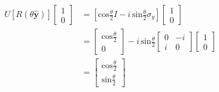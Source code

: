     \begin{equation*}
        \begin{split}
            U[R(\theta\hat{\mathbf{y}})]
            \begin{bmatrix}
                1 \\
                0
            \end{bmatrix} & = \left[ \textrm{cos}\frac{\theta}{2}I - i \, \textrm{sin}\frac{\theta}{2}\sigma_{y}\right]
            \begin{bmatrix}
                1 \\
                0
            \end{bmatrix} \\
            & = 
            \begin{bmatrix}
                \textrm{cos}\frac{\theta}{2} \\
                0
            \end{bmatrix} - i \, \textrm{sin}\frac{\theta}{2}
            \begin{bmatrix}
                0 & -i \\
                i & 0
            \end{bmatrix}
            \begin{bmatrix}
                1 \\
                0
            \end{bmatrix} \\
            & = 
            \begin{bmatrix}
                \textrm{cos}\frac{\theta}{2} \\
                \textrm{sin}\frac{\theta}{2}
            \end{bmatrix}
        \end{split}
    \end{equation*}

